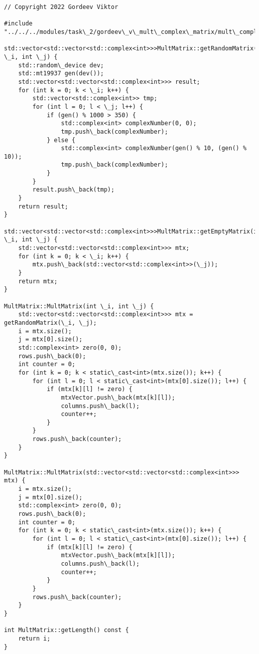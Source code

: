 \documentclass{report}
\begin{document}
\begin{lstlisting}
// Copyright 2022 Gordeev Viktor

#include "../../../modules/task\_2/gordeev\_v\_mult\_complex\_matrix/mult\_complex\_matrix.h"

std::vector<std::vector<std::complex<int>>>MultMatrix::getRandomMatrix(int \_i, int \_j) {
    std::random\_device dev;
    std::mt19937 gen(dev());
    std::vector<std::vector<std::complex<int>>> result;
    for (int k = 0; k < \_i; k++) {
        std::vector<std::complex<int>> tmp;
        for (int l = 0; l < \_j; l++) {
            if (gen() % 1000 > 350) {
                std::complex<int> complexNumber(0, 0);
                tmp.push\_back(complexNumber);
            } else {
                std::complex<int> complexNumber(gen() % 10, (gen() % 10));
                tmp.push\_back(complexNumber);
            }
        }
        result.push\_back(tmp);
    }
    return result;
}

std::vector<std::vector<std::complex<int>>>MultMatrix::getEmptyMatrix(int \_i, int \_j) {
    std::vector<std::vector<std::complex<int>>> mtx;
    for (int k = 0; k < \_i; k++) {
        mtx.push\_back(std::vector<std::complex<int>>(\_j));
    }
    return mtx;
}

MultMatrix::MultMatrix(int \_i, int \_j) {
    std::vector<std::vector<std::complex<int>>> mtx = getRandomMatrix(\_i, \_j);
    i = mtx.size();
    j = mtx[0].size();
    std::complex<int> zero(0, 0);
    rows.push\_back(0);
    int counter = 0;
    for (int k = 0; k < static\_cast<int>(mtx.size()); k++) {
        for (int l = 0; l < static\_cast<int>(mtx[0].size()); l++) {
            if (mtx[k][l] != zero) {
                mtxVector.push\_back(mtx[k][l]);
                columns.push\_back(l);
                counter++;
            }
        }
        rows.push\_back(counter);
    }
}

MultMatrix::MultMatrix(std::vector<std::vector<std::complex<int>>> mtx) {
    i = mtx.size();
    j = mtx[0].size();
    std::complex<int> zero(0, 0);
    rows.push\_back(0);
    int counter = 0;
    for (int k = 0; k < static\_cast<int>(mtx.size()); k++) {
        for (int l = 0; l < static\_cast<int>(mtx[0].size()); l++) {
            if (mtx[k][l] != zero) {
                mtxVector.push\_back(mtx[k][l]);
                columns.push\_back(l);
                counter++;
            }
        }
        rows.push\_back(counter);
    }
}

int MultMatrix::getLength() const {
    return i;
}


\end{lstlisting}
\end{document}

